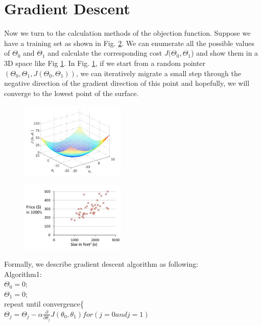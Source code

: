 \documentclass{article}
\begin{document}
\section{Gradient Descent}
Now we turn to the calculation methods of the objection function. Suppose we have a training set as shown in Fig. \ref{training_dataset}. We can enumerate all the possible values of $\Theta_0$ and $\Theta_1$ and calculate the corresponding cost $J(\Theta_0, \Theta_1$) and show them in a 3D space like Fig \ref{3D_cost_function_plot}. In Fig. \ref{3D_cost_function_plot}, if we start from a random pointer$(\Theta_0, \Theta_1, J(\Theta_0, \Theta_1))$, we can iteratively migrate a small step through the negative direction of the gradient direction of this point and hopefully, we will converge to the lowest point of the surface.
\begin{figure}[ht]
  \centering
  \includegraphics[width=5cm]{Figure2.jpg}\\
  \caption{}\label{3D_cost_function_plot}
\end{figure}
\begin{figure}[ht]
  \centering
  \includegraphics[width=5cm]{Figure3.jpg}\\
  \caption{}\label{training_dataset}
\end{figure}
\newline Formally, we describe gradient descent algorithm as following:\\
Algorithm1:\\
$\Theta_0 = 0;$\\
$\Theta_1 = 0;$\\
repeat until convergence\{\\
$\Theta_j = \Theta_j - \alpha\frac{\partial}{\partial \theta_j}J(\theta_0, \theta_1) for(j = 0 and j = 1)$\\
\end{document}
